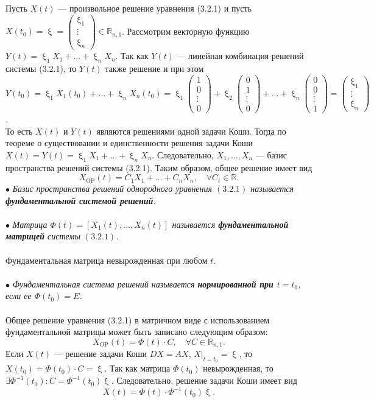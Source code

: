 \documentclass[a4paper, 12pt]{report}
\newcommand{\Rm}{\mathbb{R}}
\newcommand{\FI}{\Phi}
\renewcommand{\xi}{\upxi}
\begin{document}
Пусть $X(t)$ --- произвольное решение уравнения (3.2.1) и пусть $X(t_0) = \xi = \begin{pmatrix}
	\xi_1 \\ \vdots \\ \xi_n
\end{pmatrix} \in \Rm_{n,1}$. Рассмотрим векторную функцию $Y(t) = \xi_1X_1 + \ldots + \xi_nX_n$. Так как $Y(t)$ --- линейная комбинация решений системы (3.2.1), то $Y(t)$ также решение и при этом $Y(t_0) = \xi_1X_1(t_0) + \ldots + \xi_nX_n(t_0) = \xi_1\begin{pmatrix}
1\\0\\\vdots\\0
\end{pmatrix} + \xi_2\begin{pmatrix}
0\\1\\\vdots\\0
\end{pmatrix} + \ldots + \xi_n\begin{pmatrix}
0\\0\\\vdots\\1
\end{pmatrix} = \begin{pmatrix}
\xi_1 \\ \vdots \\ \xi_n
\end{pmatrix}$.\\
То есть $X(t)$ и $Y(t)$ являются решениями одной задачи Коши. Тогда по теореме о существовании и единственности решения задачи Коши $X(t) = Y(t) = \xi_1X_1 + \ldots + \xi_nX_n$. Следовательно, $X_1,\ldots,X_n$ --- базис пространства решений системы (3.2.1). Таким образом, общее решение имеет вид $$X_{\text{OP}}(t) = C_1X_1 + \ldots + C_nX_n,\quad \forall C_i \in \Rm.$$
$\bullet$ \textit{Базис пространства решений однородного уравнения $(3.2.1)$ называется \textbf{фундаментальной системой решений}.}\\\\
$\bullet$ \textit{Матрица $\FI(t) = [X_1(t),\ldots,X_n(t)]$ называется \textbf{фундаментальной матрицей} системы $(3.2.1)$.}\\\\
Фундаментальная матрица невырожденная при любом $t$.\\\\
$\bullet$ \textit{Фундаментальная система решений называется \textbf{нормированной при $t = t_0$}, если ее $\FI(t_0) = E$.}\\\\
Общее решение уравнения (3.2.1) в матричном виде с использованием фундаментальной матрицы может быть записано следующим образом: $$X_{\text{OP}}(t) = \FI(t)\cdot C, \quad \forall C \in \Rm_{n,1}.$$
Если $X(t)$ --- решение задачи Коши $DX = AX$, $X|_{t=t_0} = \xi$, то $X(t_0) = \FI(t_0)\cdot C = \xi$. Так как матрица $\FI(t_0)$ невырожденная, то $\exists \FI^{-1}(t_0) : C = \FI^{-1}(t_0)\xi$. Следовательно, решение задачи Коши имеет вид $$X(t) = \FI(t)\cdot \FI^{-1}(t_0)\xi.$$
\end{document}
